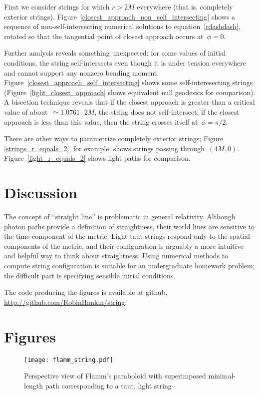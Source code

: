 \documentclass[review]{elsarticle}
\begin{document}
First we consider strings for which $r>2M$ everywhere (that is,
completely exterior strings).
Figure~\ref{closest_approach_non_self_intersecting} shows a sequence
of non-self-intersecting numerical solutions to
equation~\ref{rdashdash}, rotated so that the tangential point of
closest approach occurs at~$\phi=0$.

Further analysis reveals something unexpected: for some values of
initial conditions, the string self-intersects even though it is under
tension everywhere and cannot support any nonzero bending moment.
Figure~\ref{closest_approach_self_intersecting} shows some
self-interesecting strings (Figure~\ref{light_closest_approach} shows
equivalent null geodesics for comparison).  A bisection technique
reveals that if the closest approach is greater than a critical value
of about~$\simeq 1.0761\cdot 2M$, the string does not self-intersect;
if the closest approach is less than this value, then the string
crosses itself at~$\phi=\pi/2$.

There are other ways to parametrize completely exterior strings;
Figure \ref{strings_r_equals_2}, for example, shows strings passing
through~$(4M,0)$.  Figure~\ref{light_r_equals_2} shows light paths for
comparison.

\section{Discussion}

The concept of ``straight line'' is problematic in general relativity.
Although photon paths provide a definition of straightness, their
world lines are sensitive to the time component of the metric.  Light
taut strings respond only to the spatial components of the metric, and
their configuration is arguably a more intuitive and helpful way to
think about straightness.  Using numerical methods to compute string
configuration is suitable for an undergraduate homework problem; the
difficult part is specifying sensible initial conditions.

The code producing the figures is available at github,
\url{http://github.com/RobinHankin/string}.



\clearpage

\section*{Figures}

\begin{figure}[h!] %
\centering
\texttt{[image: flamm\_string.pdf]}
\caption{Perspective view of Flamm's paraboloid with superimposed minimal-length
  path corresponding to a taut, light string}
\label{flamm}
\end{figure}
\end{document}
